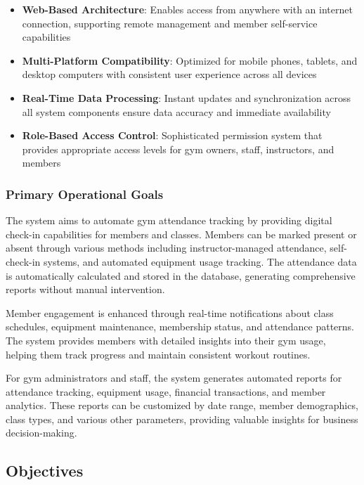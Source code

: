 \documentclass[12pt,a4paper]{report}
\begin{document}
\begin{itemize}[leftmargin=*]
    \item \textbf{Web-Based Architecture}: Enables access from anywhere with an internet connection, supporting remote management and member self-service capabilities
    \item \textbf{Multi-Platform Compatibility}: Optimized for mobile phones, tablets, and desktop computers with consistent user experience across all devices
    \item \textbf{Real-Time Data Processing}: Instant updates and synchronization across all system components ensure data accuracy and immediate availability
    \item \textbf{Role-Based Access Control}: Sophisticated permission system that provides appropriate access levels for gym owners, staff, instructors, and members
\end{itemize}

\subsubsection{Primary Operational Goals}

The system aims to automate gym attendance tracking by providing digital check-in capabilities for members and classes. Members can be marked present or absent through various methods including instructor-managed attendance, self-check-in systems, and automated equipment usage tracking. The attendance data is automatically calculated and stored in the database, generating comprehensive reports without manual intervention.

Member engagement is enhanced through real-time notifications about class schedules, equipment maintenance, membership status, and attendance patterns. The system provides members with detailed insights into their gym usage, helping them track progress and maintain consistent workout routines.

For gym administrators and staff, the system generates automated reports for attendance tracking, equipment usage, financial transactions, and member analytics. These reports can be customized by date range, member demographics, class types, and various other parameters, providing valuable insights for business decision-making.

\subsection{Objectives}
\end{document}
